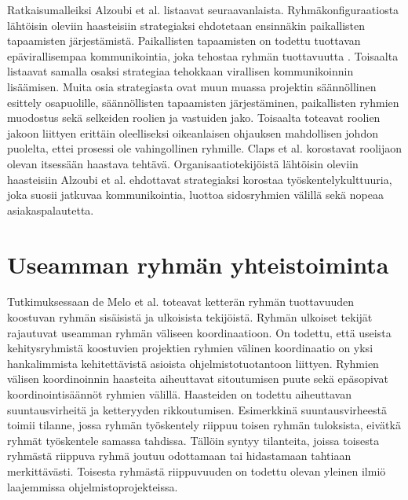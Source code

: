 Ratkaisumalleiksi Alzoubi et al. \cite{ALZOUBI201622} listaavat seuraavanlaista. Ryhmäkonfiguraatiosta lähtöisin oleviin haasteisiin strategiaksi ehdotetaan ensinnäkin paikallisten tapaamisten järjestämistä. Paikallisten tapaamisten on todettu tuottavan epävirallisempaa kommunikointia, joka tehostaa ryhmän tuottavuutta \cite{DEOMELO2013412}. Toisaalta \cite{ALZOUBI201622} listaavat samalla osaksi strategiaa tehokkaan virallisen kommunikoinnin lisäämisen. Muita osia strategiasta ovat muun muassa projektin säännöllinen esittely osapuolille, säännöllisten tapaamisten järjestäminen, paikallisten ryhmien muodostus sekä selkeiden roolien ja vastuiden jako. Toisaalta \cite{CLAPS201521} toteavat roolien jakoon liittyen erittäin oleelliseksi oikeanlaisen ohjauksen mahdollisen johdon puolelta, ettei prosessi ole vahingollinen ryhmille. Claps et al. \cite{CLAPS201521} korostavat roolijaon olevan itsessään haastava tehtävä. Organisaatiotekijöistä lähtöisin oleviin haasteisiin Alzoubi et al. \cite{ALZOUBI201622} ehdottavat strategiaksi korostaa työskentelykulttuuria, joka suosii jatkuvaa kommunikointia, luottoa sidosryhmien välillä sekä nopeaa asiakaspalautetta. 

\section{Useamman ryhmän yhteistoiminta}

Tutkimuksessaan de Melo et al. \cite{DEOMELO2013412} toteavat ketterän ryhmän tuottavuuden koostuvan ryhmän sisäisistä ja ulkoisista tekijöistä. Ryhmän ulkoiset tekijät rajautuvat useamman ryhmän väliseen koordinaatioon. On todettu, että useista kehitysryhmistä koostuvien projektien ryhmien välinen koordinaatio on yksi hankalimmista kehitettävistä asioista ohjelmistotuotantoon liittyen. Ryhmien välisen koordinoinnin haasteita aiheuttavat sitoutumisen puute sekä epäsopivat koordinointisäännöt ryhmien välillä. Haasteiden on todettu aiheuttavan suuntausvirheitä ja ketteryyden rikkoutumisen. Esimerkkinä suuntausvirheestä toimii tilanne, jossa ryhmän työskentely riippuu toisen ryhmän tuloksista, eivätkä ryhmät työskentele samassa tahdissa. Tällöin syntyy tilanteita, joissa toisesta ryhmästä riippuva ryhmä joutuu odottamaan tai hidastamaan tahtiaan merkittävästi. Toisesta ryhmästä riippuvuuden on todettu olevan yleinen ilmiö laajemmissa ohjelmistoprojekteissa.

